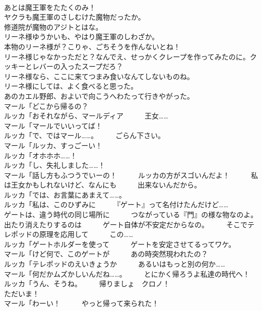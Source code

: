 \documentclass[8pt]{extreport}
\begin{document}
\begin{CJK}{UTF8}{min}
\\	あとは魔王軍をたたくのみ！	
\\	ヤクラも魔王軍のさしむけた魔物だったか。	
\\	修道院が魔物のアジトとはな。	
\\	リーネ様ゆうかいも、やはり魔王軍のしわざか。	
\\	本物のリーネ様が？こりゃ、ごちそうを作んないとね！	
\\	リーネ様じゃなかっただと？なんでえ、せっかくクレープを作ってみたのに。クッキーとレバーの入ったスープだろ？	
\\	リーネ様なら、ここに来てつまみ食いなんてしないものね。	
\\	リーネ様にしては、よく食べると思った。	
\\	あのカエル野郎、およいで向こうへわたって行きやがった。	
\\	マール「どこから帰るの？	
\\	ルッカ「おそれながら、マールディア　　　王女……	
\\	マール「マールでいいってば！	
\\	ルッカ「で、ではマール……。　　　ごらん下さい。	
\\	マール「ルッカ、すっごーい！	
\\	ルッカ「オホホホ……！	
\\	ルッカ「し、失礼しました……！	
\\	マール「話し方もふつうでいーの！　　　ルッカの方がスゴいんだよ！　　　私は王女かもしれないけど、なんにも　　　出来ないんだから。	
\\	ルッカ「では、お言葉にあまえて……。	
\\	ルッカ「私は、このひずみに　　　『ゲート』って名付けたんだけど……	
\\	ゲートは、違う時代の同じ場所に　　　つながっている『門』の様な物なのよ。	
\\	出たり消えたりするのは　　　ゲート自体が不安定だからなの。　　　そこでテレポッドの原理を応用して　　　この……	
\\	ルッカ「ゲートホルダーを使って　　　ゲートを安定させてるってワケ。	
\\	マール「けど何で、このゲートが　　　あの時突然現われたの？	
\\	ルッカ「テレポッドのえいきょうか　　　あるいはもっと別の何か……	
\\	マール「何だかムズかしいんだね……。　　　とにかく帰ろうよ私達の時代へ！	
\\	ルッカ「うん、そうね。　　　帰りましょ　クロノ！	
\\	ただいま！	
\\	マール「わーい！　　　やっと帰って来られた！	

\end{CJK}
\end{document}
